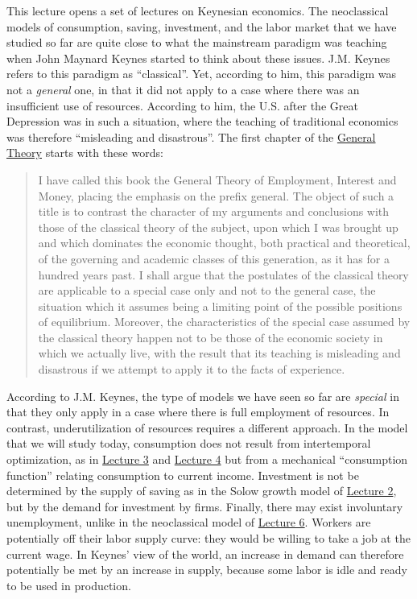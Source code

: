 \documentclass[]{book}
\theoremstyle{definition}
\theoremstyle{definition}
\theoremstyle{definition}
\theoremstyle{remark}
\begin{document}
This lecture opens a set of lectures on Keynesian economics. The
neoclassical models of consumption, saving, investment, and the labor
market that we have studied so far are quite close to what the
mainstream paradigm was teaching when John Maynard Keynes started to
think about these issues. J.M. Keynes refers to this paradigm as
``classical''. Yet, according to him, this paradigm was not a
\emph{general} one, in that it did not apply to a case where there was
an insufficient use of resources. According to him, the U.S. after the
Great Depression was in such a situation, where the teaching of
traditional economics was therefore ``misleading and disastrous''. The
first chapter of the
\href{http://cas2.umkc.edu/economics/people/facultypages/kregel/courses/econ645/winter2011/generaltheory.pdf}{General
Theory} starts with these words:

\begin{quote}
I have called this book the General Theory of Employment, Interest and
Money, placing the emphasis on the prefix general. The object of such a
title is to contrast the character of my arguments and conclusions with
those of the classical theory of the subject, upon which I was brought
up and which dominates the economic thought, both practical and
theoretical, of the governing and academic classes of this generation,
as it has for a hundred years past. I shall argue that the postulates of
the classical theory are applicable to a special case only and not to
the general case, the situation which it assumes being a limiting point
of the possible positions of equilibrium. Moreover, the characteristics
of the special case assumed by the classical theory happen not to be
those of the economic society in which we actually live, with the result
that its teaching is misleading and disastrous if we attempt to apply it
to the facts of experience.
\end{quote}

According to J.M. Keynes, the type of models we have seen so far are
\emph{special} in that they only apply in a case where there is full
employment of resources. In contrast, underutilization of resources
requires a different approach. In the model that we will study today,
consumption does not result from intertemporal optimization, as in
\protect\hyperlink{two-period}{Lecture 3} and
\protect\hyperlink{olg}{Lecture 4} but from a mechanical ``consumption
function'' relating consumption to current income. Investment is not be
determined by the supply of saving as in the Solow growth model of
\protect\hyperlink{solow}{Lecture 2}, but by the demand for investment
by firms. Finally, there may exist involuntary unemployment, unlike in
the neoclassical model of \protect\hyperlink{labor-market}{Lecture 6}.
Workers are potentially off their labor supply curve: they would be
willing to take a job at the current wage. In Keynes' view of the world,
an increase in demand can therefore potentially be met by an increase in
supply, because some labor is idle and ready to be used in production.
\end{document}
